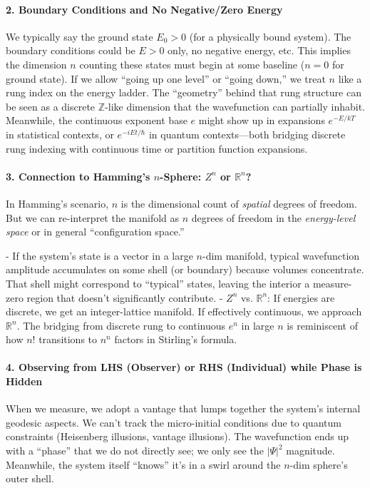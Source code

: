 \documentclass{article}
\begin{document}
\paragraph{2. Boundary Conditions and No Negative/Zero Energy}

We typically say the ground state $E_0>0$ (for a physically bound system). The boundary conditions could be $E>0$ only, no negative energy, etc. This implies the dimension $n$ counting these states must begin at some baseline ($n=0$ for ground state). If we allow “going up one level” or “going down,” we treat $n$ like a rung index on the energy ladder. The “geometry” behind that rung structure can be seen as a discrete $\mathbb{Z}$-like dimension that the wavefunction can partially inhabit. Meanwhile, the continuous exponent base $e$ might show up in expansions $e^{-E/kT}$ in statistical contexts, or $e^{-iEt/\hbar}$ in quantum contexts—both bridging discrete rung indexing with continuous time or partition function expansions.

\paragraph{3. Connection to Hamming’s $n$-Sphere: $Z^n$ or $\mathbb{R}^n$?}

In Hamming’s scenario, $n$ is the dimensional count of \emph{spatial} degrees of freedom. But we can re-interpret the manifold as $n$ degrees of freedom in the \emph{energy-level space} or in general “configuration space.”

- If the system’s state is a vector in a large $n$-dim manifold, typical wavefunction amplitude accumulates on some shell (or boundary) because volumes concentrate. That shell might correspond to “typical” states, leaving the interior a measure-zero region that doesn’t significantly contribute.
- $Z^n$ vs. $\mathbb{R}^n$: If energies are discrete, we get an integer-lattice manifold. If effectively continuous, we approach $\mathbb{R}^n$. The bridging from discrete rung to continuous $e^{n}$ in large $n$ is reminiscent of how $n!$ transitions to $n^n$ factors in Stirling’s formula.

\paragraph{4. Observing from LHS (Observer) or RHS (Individual) while Phase is Hidden}

When we measure, we adopt a vantage that lumps together the system’s internal geodesic aspects. We can’t track the micro-initial conditions due to quantum constraints (Heisenberg illusions, vantage illusions). The wavefunction ends up with a “phase” that we do not directly see; we only see the $|\Psi|^2$ magnitude. Meanwhile, the system itself “knows” it’s in a swirl around the $n$-dim sphere’s outer shell.
\end{document}
